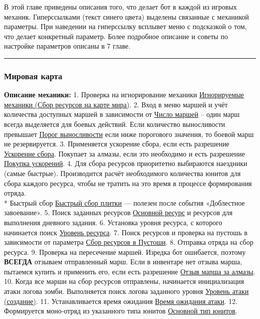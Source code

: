 \documentclass[
]{article}
\begin{document}
В этой главе приведены описания того, что делает бот в каждой из игровых
механик. Гиперссылками (текст синего цвета) выделены связанные с
механикой параметры. При наведении на гиперссылку всплывет меню с
подсказкой о том, что делает конкретный параметр. Более подробное
описание и советы по настройке параметров описаны в 7 главе.

\begin{center}\rule{0.5\linewidth}{0.5pt}\end{center}

\subsubsection{Мировая
карта}\label{ux43cux438ux440ux43eux432ux430ux44f-ux43aux430ux440ux442ux430}

\textbf{Описание механики:} 1. Проверка на игнорирование механики
\hyperref[ignor_states]{Игнорируемые механики (Сбор ресурсов на карте
мира)}. 2. Вход в меню маршей и учёт количества доступных маршей в
зависимости от \hyperref[march_max_count]{Число маршей} – один марш
всегда выделяется для боевых действий. Если количество выносливости
превышает \hyperref[stamina_threshold]{Порог выносливости} если ниже
порогового значения, то боевой марш не резервируется. 3. Применяется
ускорение сбора, если есть разрешение
\hyperref[sr_tile_speed_up]{Ускорение сбора}. Покупает за алмазы, если
это необходимо и есть разрешение \hyperref[sr_tile_speed_up_buy]{Покупка
ускорений}. 4. Для сбора ресурсов приоритетно выбираются наездники
(самые быстрые). Производится расчёт необходимого количества юнитов для
сбора каждого ресурса, чтобы не тратить на это время в процессе
формирования отряда.\\
* Быстрый сбор \hyperref[map_speed_up]{Быстрый сбор плитки} — полезен
после события «Доблестное завоевание». 5. Поиск заданных ресурсов
\hyperref[map_main_resource_type]{Основной ресурс} и ресурсов для
выполнения дневного задания. 6. Установка уровня ресурса, с которого
начинается поиск \hyperref[map_resource_start_lvl]{Уровень ресурса}. 7.
Поиск ресурсов и проверка на пустошь в зависимости от параметра
\hyperref[map_resource_allow_wasteland]{Сбор ресурсов в Пустоши}. 8.
Отправка отряда на сбор ресурса. 9. Проверка на пересечение маршей.
Изредка бот ошибается, поэтому \textbf{ВСЕГДА} отзываем отправленный
марш. Если в инвентаре нет отзыва марша, пытаемся купить и применить
его, если есть разрешение \hyperref[march_recall_gem_usage]{Отзыв марша
за алмазы}. 10. Когда все марши на сбор ресурсов отправлены, начинается
инициализация атаки логова зомби. Выполняется поиск логова заданного
уровня \hyperref[lair_lvl]{Уровень атаки (создание)}. 11.
Устанавливается время ожидания \hyperref[lair_time]{Время ожидания
атаки}. 12. Формируется моно-отряд из указанного типа юнитов
\hyperref[unit_type]{Основной тип юнитов}.
\end{document}
